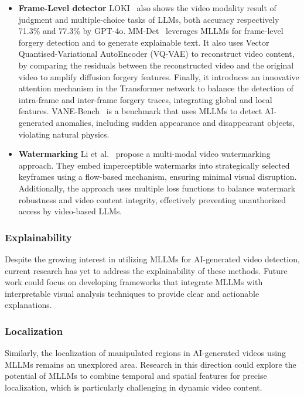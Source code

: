     \begin{itemize}
    \item \textbf{Frame-Level detector}
    LOKI~\cite{ye2024loki} also shows the video modality result of judgment and multiple-choice tasks of LLMs, both accuracy respectively 71.3\% and 77.3\% by GPT-4o. 
    MM-Det~\cite{song2024learning} leverages MLLMs for frame-level forgery detection and to generate explainable text. It also uses Vector Quantised-Variational AutoEncoder (VQ-VAE) to reconstruct video content, by comparing the residuals between the reconstructed video and the original video to amplify diffusion forgery features. Finally, it introduces an innovative attention mechanism in the Transformer network to balance the detection of intra-frame and inter-frame forgery traces, integrating global and local features. VANE-Bench~\cite{bharadwaj2024vane} is a benchmark that uses MLLMs to detect AI-generated anomalies, including sudden appearance and disappearant objects, violating natural physics. 

    \item \textbf{Watermarking}
    Li et al.~\cite{li2024video} propose a multi-modal video watermarking approach. They embed imperceptible watermarks into strategically selected keyframes using a flow-based mechanism, ensuring minimal visual disruption. Additionally, the approach uses multiple loss functions to balance watermark robustness and video content integrity, effectively preventing unauthorized access by video-based LLMs.
    
    \end{itemize}

    \subsubsection{\textbf{Explainability}}
    Despite the growing interest in utilizing MLLMs for AI-generated video detection, current research has yet to address the explainability of these methods. Future work could focus on developing frameworks that integrate MLLMs with interpretable visual analysis techniques to provide clear and actionable explanations.
    \subsubsection{\textbf{Localization}}
    Similarly, the localization of manipulated regions in AI-generated videos using MLLMs remains an unexplored area. Research in this direction could explore the potential of MLLMs to combine temporal and spatial features for precise localization, which is particularly challenging in dynamic video content.


